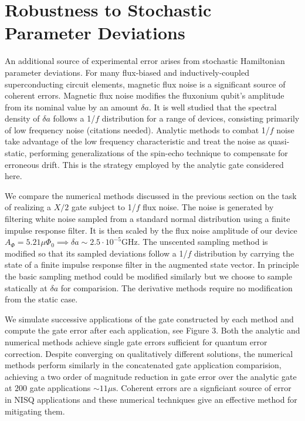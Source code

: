 \section{Robustness to Stochastic Parameter Deviations}
An additional source of experimental error arises from stochastic
Hamiltonian parameter deviations. For many flux-biased and inductively-coupled
superconducting circuit elements, magnetic flux noise is a significant
source of coherent errors. Magnetic flux noise
modifies the fluxonium qubit's amplitude from its nominal value by an amount $\delta a$.
It is well studied that the spectral density of $\delta a$ follows a
1/$f$ distribution for a range of devices, consisting primarily of low frequency
noise (citations needed). Analytic methods to combat 1/$f$ noise
take advantage of the low frequency characteristic and
treat the noise as quasi-static, performing generalizations of the spin-echo technique
to compensate for erroneous drift. This is the strategy employed by the analytic gate
considered here.

We compare the numerical methods discussed in the previous section
on the task of realizing a $X/2$ gate subject to 1/$f$ flux noise.
The noise is generated by
filtering white noise sampled from a standard normal distribution using a finite
impulse response filter. It is then scaled by the 
flux noise amplitude of our device $A_{\Phi} = 5.21 \mu \Phi_{0} \implies
\delta a \sim 2.5 \cdot 10^{-5} \textrm{GHz}$.
The unscented sampling method is modified so that its sampled deviations
follow a 1/$f$ distribution by carrying the state of a finite impulse response filter
in the augmented state vector. In principle the basic sampling method could be modified
similarly but we choose to sample statically at $\delta a$ for comparision. The derivative
methods require no modification from the static case.

We simulate successive applications of the gate constructed by each method and compute the gate error
after each application, see Figure 3. Both the analytic and numerical methods achieve single gate errors
sufficient for quantum error correction. Despite converging on qualitatively different solutions, the
numerical methods perform similarly in the concatenated gate application comparision, achieving a two
order of magnitude reduction in gate error over the analytic gate at $200$
gate applications $\sim 11 \mu\textrm{s}$.
Coherent errors are a signficiant source of error in NISQ applications and these numerical techniques give
an effective method for mitigating them.
